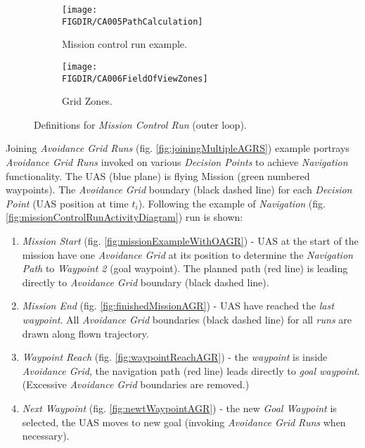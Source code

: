 \begin{figure}[H]
    \centering
    \begin{subfigure}{0.48\textwidth}
        \centering
        \texttt{[image: \\FIGDIR/CA005PathCalculation]}
        \caption{Mission control run example.}
        \label{fig:missionControlRunExample}
    \end{subfigure}
    \begin{subfigure}{0.48\textwidth}
    	\centering
        \texttt{[image: \\FIGDIR/CA006FieldOfViewZones]} 
        \caption{Grid Zones.}
        \label{fig:gridZonesMissionControl}
    \end{subfigure}
    \caption{Definitions for \emph{Mission Control Run} (outer loop).}
    \label{fig:definitionsForMissionControlRun}
\end{figure}

\noindent Joining \emph{Avoidance Grid Runs} (fig. \ref{fig:joiningMultipleAGRS})  example portrays \emph{Avoidance Grid Runs} invoked on various \emph{Decision Points} to achieve \emph{Navigation} functionality. The UAS (blue plane) is flying Mission (green numbered waypoints). The \emph{Avoidance Grid} boundary (black dashed line) for each \emph{Decision Point} (UAS position at time $t_i$). Following the example of \emph{Navigation} (fig. \ref{fig:missionControlRunActivityDiagram}) run is shown:

\begin{enumerate}
    \item \emph{Mission Start} (fig. \ref{fig:missionExampleWithOAGR}) - UAS at the start of the mission have one \emph{Avoidance Grid} at its position to determine the \emph{Navigation Path} to \emph{Waypoint 2} (goal waypoint). The planned path (red line) is leading directly to \emph{Avoidance Grid} boundary (black dashed line).
    
    \item \emph{Mission End} (fig. \ref{fig:finishedMissionAGR}) - UAS have reached 
    the \emph{last waypoint}. All \emph{Avoidance Grid} boundaries (black dashed line) for all \emph{runs} are drawn along flown trajectory. 
    
    \item \emph{Waypoint Reach} (fig. \ref{fig:waypointReachAGR}) - the \emph{waypoint} is inside \emph{Avoidance Grid}, the navigation path (red line) leads directly to \emph{goal waypoint}. (Excessive \emph{Avoidance Grid} boundaries are removed.)
    
    \item \emph{Next Waypoint} (fig. \ref{fig:newtWaypointAGR}) - the new \emph{Goal Waypoint} is selected, the UAS moves to new goal (invoking \emph{Avoidance Grid Runs} when necessary).
    
\end{enumerate}

